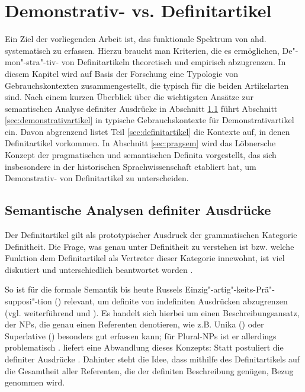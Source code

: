 \chapter{Demonstrativ- vs. Definitartikel}\label{chap:demdef}

Ein Ziel der vorliegenden Arbeit ist, das funktionale Spektrum von ahd.  systematisch zu erfassen. Hierzu braucht man Kriterien, die es ermöglichen, De"-mon"-stra"-tiv- von Definitartikeln theoretisch und empirisch  abzugrenzen. In diesem Kapitel wird auf Basis der Forschung eine Typologie von Gebrauchskontexten zusammengestellt, die typisch für die beiden Artikelarten sind. Nach einem kurzen Überblick über die wichtigsten Ansätze zur semantischen Analyse definiter Ausdrücke in Abschnitt \ref{sec:definitheitstheorien} führt Abschnitt \ref{sec:demonstrativartikel} in typische Gebrauchskontexte für Demonstrativartikel ein. Davon abgrenzend listet Teil \ref{sec:definitartikel} die Kontexte auf, in denen Definitartikel vorkommen. In Abschnitt \ref{sec:pragsem} wird das  Löbnersche Konzept der pragmatischen und semantischen Definita vorgestellt, das sich insbesondere in der historischen Sprachwissenschaft etabliert hat, um Demonstrativ- von Definitartikel zu unterscheiden. 

\section{Semantische Analysen definiter Ausdrücke} \label{sec:definitheitstheorien}

Der Definitartikel gilt als prototypischer Ausdruck der grammatischen Kategorie Definitheit. Die Frage, was genau unter Definitheit zu verstehen ist bzw. welche Funktion dem Definitartikel als Vertreter dieser Kategorie innewohnt, ist viel diskutiert und unterschiedlich beantwortet worden \parencite[zum Überblick  s.][]{Bisle-Muller1991,Hauenschild1993,Lyons1999,Abbott2007,Cui2014}.

So ist für die formale Semantik bis heute Russels Einzig"-artig"-keits-Prä"-supposi"-tion () relevant, um definite von indefiniten Ausdrücken abzugrenzen (vgl. weiterführend \citealt{Russel1905} und \citealt{Heim1991,Heim2011}). Es handelt sich hierbei um einen Beschreibungsansatz, der NPs, die genau einen Referenten denotieren, wie z.B. Unika () oder Superlative () besonders gut erfassen kann; für  Plural-NPs  ist er allerdings problematisch \parencite[vgl. die Diskussion hierzu in][7--11] {Lyons1999}. \textcite{Hawkins1978} liefert eine Abwandlung dieses Konzepts: Statt  postuliert die  definiter Ausdrücke  \parencite[kritisch hierzu:][32]{Bisle-Muller1991}. Dahinter steht die Idee, dass mithilfe des Definitartikels auf die Gesamtheit aller Referenten, die der definiten Beschreibung genügen, Bezug genommen wird.

